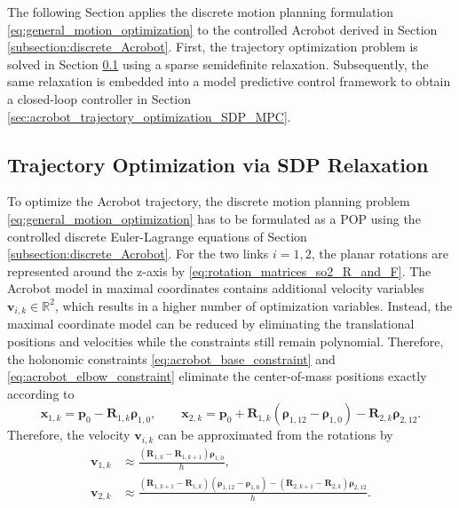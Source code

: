 The following Section applies the discrete motion planning formulation \eqref{eq:general_motion_optimization}
to the controlled Acrobot derived in Section \ref{subsection:discrete_Acrobot}. 
First, the trajectory optimization problem is solved in Section 
\ref{sec:trajectory_optimization_via_sdp_relaxation} 
using a sparse semidefinite relaxation. Subsequently, the same relaxation is 
embedded into a model predictive control framework to obtain a 
closed-loop controller in Section \ref{sec:acrobot_trajectory_optimization_SDP_MPC}.

\subsection{Trajectory Optimization via SDP Relaxation}
\label{sec:trajectory_optimization_via_sdp_relaxation}
To optimize the Acrobot trajectory, the discrete motion planning
problem \eqref{eq:general_motion_optimization} has to be formulated as a POP using
the controlled discrete Euler-Lagrange equations of Section \ref{subsection:discrete_Acrobot}. 
For the two links $i=1,2$, the planar rotations are represented around the z-axis by 
\eqref{eq:rotation_matrices_so2_R_and_F}.
The Acrobot model in maximal coordinates contains additional 
velocity variables $\bm{v}_{i,k}\in\mathbb R^2$, which results in a higher number of optimization variables.
Instead, the maximal coordinate model can be reduced by eliminating the
translational positions and velocities while the constraints still remain
polynomial. Therefore, the 
holonomic constraints \eqref{eq:acrobot_base_constraint} and 
\eqref{eq:acrobot_elbow_constraint} eliminate the center-of-mass
positions exactly according to
\begin{equation}
\bm{x}_{1,k}=\bm{p}_0-\bm{R}_{1,k}\bm{\rho}_{1,0},
\qquad
\bm{x}_{2,k}=\bm{p}_0+\bm{R}_{1,k}(\bm{\rho}_{1,12}-\bm{\rho}_{1,0})
               -\bm{R}_{2,k}\bm{\rho}_{2,12}.
\label{eq:acrobot_eliminated_positions}
\end{equation}
Therefore, the velocity $\bm{v}_{i,k}$ can be approximated from the rotations by  
\begin{subequations}\label{eq:velocity_approximation_rotations}
\begin{align}
    \bm{v}_{1,k}
    &\approx
    \frac{(\bm{R}_{1,k}-\bm{R}_{1,k+1})\bm{\rho}_{1,0}}{h},
    \label{eq:velocity_approximation_link1}\\
    \bm{v}_{2,k}
    &\approx
    \frac{
        (\bm{R}_{1,k+1}-\bm{R}_{1,k})
        (\bm{\rho}_{1,12}-\bm{\rho}_{1,0})
        -(\bm{R}_{2,k+1}-\bm{R}_{2,k})\bm{\rho}_{2,12}
    }{h}.
    \label{eq:velocity_approximation_link2}
\end{align}
\end{subequations}
